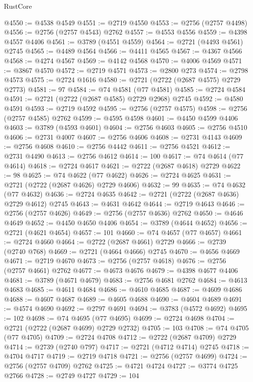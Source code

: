 \begin{lexlean}{RustCore}
\begin{coremodule}
@4550 := @4538 @4549
@4551 := @2719 @4550
@4553 := @2756 (@2757 @4498)
@4556 := @2756 (@2757 @4543) @2762
@4557 := @4553 @4556
@4559 := @4398 @4557 @4406
@4561 := @3789 (@4551 @4559)
@4564 := @2721 (@4493 @4561) @2745
@4565 := @4489 @4564
@4566 := @4411 @4565
@4567 := @4367 @4566
@4568 := @4274 @4567
@4569 := @4142 @4568
@4570 := @4006 @4569
@4571 := @3867 @4570
@4572 := @2719 @4571
@4573 := @2800 @273
@4574 := @2798 @4573
@4575 := @2724 @1616
@4580 := @2721 (@2722 (@2687 @4575) @2729 @2773)
@4581 := 97
@4584 := @74 @4581 (@77 @4581)
@4585 := @2724 @4584
@4591 := @2721 (@2722 (@2687 @4585) @2729 @2968) @2745
@4592 := @4580 @4591
@4593 := @2719 @4592
@4595 := @2756 (@2757 @4575)
@4598 := @2756 (@2757 @4585) @2762
@4599 := @4595 @4598
@4601 := @4450 @4599 @4406
@4603 := @3789 (@4593 @4601)
@4604 := @2756 @4603
@4605 := @2756 @4510
@4606 := @2731 @4007
@4607 := @2756 @4606
@4608 := @2731 @4143
@4609 := @2756 @4608
@4610 := @2756 @4442
@4611 := @2756 @4521
@4612 := @2731 @4490
@4613 := @2756 @4612
@4614 := 100
@4617 := @74 @4614 (@77 @4614)
@4618 := @2724 @4617
@4621 := @2722 (@2687 @4618) @2729
@4622 := 98
@4625 := @74 @4622 (@77 @4622)
@4626 := @2724 @4625
@4631 := @2721 (@2722 (@2687 @4626) @2729 @4606)
@4632 := 99
@4635 := @74 @4632 (@77 @4632)
@4636 := @2724 @4635
@4642 := @2721 (@2722 (@2687 @4636) @2729 @4612) @2745
@4643 := @4631 @4642
@4644 := @2719 @4643
@4646 := @2756 (@2757 @4626)
@4649 := @2756 (@2757 @4636) @2762
@4650 := @4646 @4649
@4652 := @4450 @4650 @4406
@4654 := @3789 (@4644 @4652)
@4656 := @2721 (@4621 @4654)
@4657 := 101
@4660 := @74 @4657 (@77 @4657)
@4661 := @2724 @4660
@4664 := @2722 (@2687 @4661) @2729
@4666 := @2739 (@2740 @768)
@4669 := @2721 (@4664 @4666) @2745
@4670 := @4656 @4669
@4671 := @2719 @4670
@4673 := @2756 (@2757 @4618)
@4676 := @2756 (@2757 @4661) @2762
@4677 := @4673 @4676
@4679 := @4398 @4677 @4406
@4681 := @3789 (@4671 @4679)
@4683 := @2756 @4681 @2762
@4684 := @4613 @4683
@4685 := @4611 @4684
@4686 := @4610 @4685
@4687 := @4609 @4686
@4688 := @4607 @4687
@4689 := @4605 @4688
@4690 := @4604 @4689
@4691 := @4574 @4690
@4692 := @2797 @4691
@4694 := @3783 (@4572 @4692)
@4695 := 102
@4698 := @74 @4695 (@77 @4695)
@4699 := @2724 @4698
@4704 := @2721 (@2722 (@2687 @4699) @2729 @2732)
@4705 := 103
@4708 := @74 @4705 (@77 @4705)
@4709 := @2724 @4708
@4712 := @2722 (@2687 @4709) @2729
@4714 := @2739 (@2740 @797)
@4717 := @2721 (@4712 @4714) @2745
@4718 := @4704 @4717
@4719 := @2719 @4718
@4721 := @2756 (@2757 @4699)
@4724 := @2756 (@2757 @4709) @2762
@4725 := @4721 @4724
@4727 := @3774 @4725 @2766
@4728 := @2749 @4727
@4729 := 104

\end{coremodule}
\end{lexlean}
